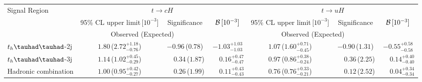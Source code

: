 \documentclass[PAPER, coverpage, atlasdraft=true, texlive=2016, UKenglish]{\ATLASLATEXPATH atlasdoc}
\begin{document}
\begin{table}[t!]
\begin{center}
{\begin{tabular}{lcccccc}
\multirow{3}{*}{Signal Region} & \multicolumn{3}{c}{$t\to cH$}                                & \multicolumn{3}{c}{$t\to uH$}  \\
                                &  95\% CL upper limit\,[$10^{-3}$]  & Significance             &  $\mathcal{B}\,[10^{-3}]$ &     95\% CL upper limit\,[$10^{-3}$]  & Significance   &  $\mathcal{B}\,[10^{-3}]$  \\
                                &  \multicolumn{2}{c}{Observed (Expected)}                     &        &     \multicolumn{2}{c}{Observed (Expected)}& \\
\midrule
$t_h\thadhad$-2j                & $1.80$\,($2.72^{+1.18}_{-0.76}$)&$-0.96$\,($0.78$) & $-1.03^{+1.03}_{-1.03}$&$1.07$\,($1.60^{+0.71}_{-0.45}$)&$-0.90$\,($1.31$) &$-0.55^{+0.58}_{-0.58}$ \\
$t_h\thadhad$-3j                & $1.14$\,($1.02^{+0.45}_{-0.29}$)& \,~~$0.34$\,($1.87$)  & \,~~$0.16^{+0.47}_{-0.47}$ &$0.97$\,($0.86^{+0.38}_{-0.24}$)& \,~~$0.36$\,($2.25$)  & \,~~$0.14^{+0.40}_{-0.40}$  \\ \midrule
Hadronic combination            & $1.00$\,($0.95^{+0.42}_{-0.27}$)& \,~~$0.26$\,($1.99$) & \,~~$0.11^{+0.43}_{-0.43}$ &$0.76$\,($0.76^{+0.33}_{-0.21}$)& \,~~$0.12$\,($2.52$)  & \,~~$0.04^{+0.34}_{-0.34}$  \\


\end{tabular}}
\end{center}
\end{table}
\end{document}
